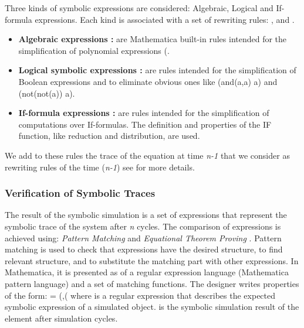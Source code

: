 \documentclass[submission,copyright,creativecommons]{eptcs}
\begin{document}
Three kinds of symbolic expressions are considered: Algebraic, Logical and If-formula expressions. Each kind is associated with a set of rewriting rules: ,  and .

\begin{itemize}
  \item \textbf{Algebraic expressions :} are Mathematica built-in rules intended for the simplification of polynomial expressions (.
  \item \textbf{Logical symbolic expressions :} are rules intended for the simplification of Boolean expressions and to eliminate obvious ones like (and(a,a) a) and (not(not(a))  a).
  \item \textbf{If-formula expressions  : }are rules intended for the simplification of computations over If-formulas. The definition and properties of the IF function, like reduction and distribution, are used.
\end{itemize}

We add to these rules the trace of the equation at time \emph{n-1} that we consider as rewriting rules of the time (\emph{n-1}) see \cite{1} for more details.

\subsubsection{Verification of Symbolic Traces}
The result of the symbolic simulation is a set of expressions that represent the symbolic trace of the system after \emph{n} cycles. The comparison of expressions is achieved using: \emph{Pattern Matching} \cite{76} and \emph{Equational Theorem Proving} \cite{77}. Pattern matching is used to check that expressions have the desired structure, to find relevant structure, and to substitute the matching part with other expressions. In Mathematica, it is presented as of a regular expression language (Mathematica pattern language) and a set of matching functions. The designer writes properties of the form:  =  (,( where  is a regular expression that describes the expected symbolic expression of a simulated object.  is the symbolic simulation result of the element  after  simulation cycles.
\end{document}
